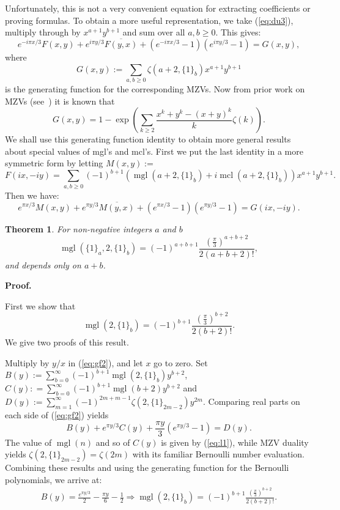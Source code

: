 \documentclass[a4paper,a4paper]{article}
\newtheorem{Thm}{Theorem}
\newcommand{\mcl}{\operatorname{mcl}}
\newcommand{\mgl}{\operatorname{mgl}}
\begin{document}
Unfortunately, this is not a very convenient equation for
extracting coefficients or proving formulas.
To obtain a more useful representation, we take
 (\ref{eq:du3}), multiply through by $ x^{a+1} y^{b+1} $
 and sum over all $ a, b \ge 0 $.
   This gives:
\begin{equation}
\label{eq:gf1}
e^{-i\pi x/3} F(x,y) + e^{i\pi y/3} \overline{F(y,x)}
 + (e^{-i\pi x/3} - 1)(e^{i\pi y/3} -1) = G(x,y),
\end{equation}
where
$$G(x,y) := \sum_{a, b \ge 0} \zeta(a + 2, \{ 1 \}_b) x^{a+1} y^{b+1}$$
is the generating function for the corresponding  MZVs.
Now from  prior work on MZVs (see~\cite{BBB}) it is known that
$$
G(x,y) = 1 - \exp \left( \sum_{k \ge 2} \frac{x^k + y^k - (x+y)^k}{k}\zeta(k)
\right).
$$
We shall use this generating function identity to obtain more general
results about special values
 of mgl's and mcl's. First we put the last identity in a more symmetric
 form by        letting
  $ M(x,y) :=$
  $$ F(ix, -iy) = \sum_{a,b \ge 0} (-1)^{b+1} (\mgl(a + 2, \{ 1 \}_b)
  + i \mcl(a + 2, \{ 1 \}_b)) x^{a+1} y^{b+1} .$$
  Then we have:
\begin{equation}
\label{eq:gf2}
e^{\pi x /3 } M(x,y) + e^{\pi y /3 } \overline{M(y,x)}
+ (e^{\pi x /3 } - 1)(e^{\pi y /3 } -1) = G(ix,-iy).
\end{equation}

\begin{Thm} For non-negative integers $a$ and $b$
\begin{equation}
\label{eq:m21}
\mgl(\{ 1 \}_a, 2, \{ 1 \}_b) =
(-1)^{a+b+1}\frac{(\frac{\pi}{3})^{a+b+2}}{2(a+b+2)!},
\end{equation}
and depends only on $a+b$.
\end{Thm}

{\raggedright \bf Proof.}
First we show that
$$ \mgl(2, \{ 1 \}_b) =
(-1)^{b+1}\frac{(\frac{\pi}{3})^{b+2}}{2(b+2)!}.$$
We give two proofs of this result.

\medskip

Multiply by $y/x $ in
(\ref{eq:gf2}),
and let $x$ go to zero. Set
$ \displaystyle{ B(y) := \sum_{b=0}^\infty (-1)^{b+1} \mgl(2, \{ 1 \}_b) y^{b+2}}$,
$ \displaystyle{ C(y): = \sum_{b=0}^\infty (-1)^{b+1}\mgl(b+2)y^{b+2} }$
and
$ \displaystyle{ D(y) := \sum_{m = 1}^\infty (-1)^{2m+m-1} \zeta(2, \{ 1 \}_{2m-2}) y^{2m}
}$.
Comparing real parts on each side of (\ref{eq:gf2}) yields
$$
B(y) + e^{\pi y /3}C(y) + \frac{\pi y}{3}(e^{\pi y/3 } -1) = D(y).
$$
The  value of $ \mgl(n)$ and so of $C(y)$ is given by
(\ref{eq:l1}), while MZV duality yields $ \zeta(2, \{ 1 \}_{2m-2}) = \zeta(2m)$
  with its familiar Bernoulli number evaluation.
  Combining these results and using the generating function for the Bernoulli
   polynomials, we arrive at:
\begin{align*}
B(y) = \frac{e^{\pi y /3}}{2} - \frac{\pi y}{6} - \frac{1}{2}
\Longrightarrow \mgl(2, \{ 1 \}_b) =
(-1)^{b+1}\frac{(\frac{\pi}{3})^{b+2}}{2(b+2)!}.
\end{align*}
\end{document}
